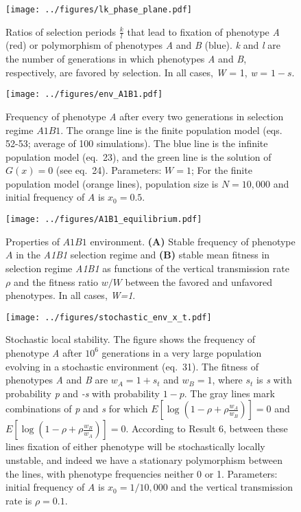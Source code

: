 \documentclass[]{article}
\begin{document}

\begin{figure}
\centering
\texttt{[image: ../figures/lk\_phase\_plane.pdf]}
\caption{Ratios of selection periods \(\frac{k}{l}\) that lead to
fixation of phenotype \emph{A} (red) or polymorphism of phenotypes
\emph{A} and \emph{B} (blue). \emph{k} and \emph{l} are the number of
generations in which phenotypes \emph{A} and \emph{B}, respectively, are favored by selection.
In all cases, \emph{W} = 1, \emph{w} = \(1-s\).}\label{fig:lk_phase_plane}
\end{figure}

\begin{figure}
\centering
\texttt{[image: ../figures/env\_A1B1.pdf]}
\caption{Frequency of phenotype \emph{A} after every two generations in
selection regime \(A1B1\). The orange line is the finite population model
(eqs. 52-53; average of 100 simulations). The blue line is the infinite population model
(eq.\ 23), and the green line is the  solution of \(G(x)=0\) (see eq.\ 24). Parameters: \(W=1\); For the finite population model (orange lines), population size is \(N=10,000\) and initial frequency of \(A\) is \(x_0=0.5\).}\label{fig:env_A1B1}
\end{figure}

\begin{figure}
\centering
\texttt{[image: ../figures/A1B1\_equilibrium.pdf]}
\caption{Properties of $A1B1$ environment.
\textbf{(A)} Stable frequency of phenotype $A$ in the \emph{A1B1} selection regime and \textbf{(B)} stable mean fitness in selection regime \emph{A1B1} as functions of the vertical transmission rate \(\rho\) and the fitness ratio \(w/W\) between the favored and unfavored phenotypes.
In all cases, \emph{W=1}.
}\label{fig:AkBl_equilibrium}
\end{figure}

\begin{figure}
\centering
\texttt{[image: ../figures/stochastic\_env\_x\_t.pdf]}
\caption{Stochastic local stability. 
The figure shows the frequency of phenotype \emph{A} after \(10^6\) generations in a very large population evolving in a stochastic environment (eq.\ 31).
The fitness of phenotypes \emph{A} and \emph{B} are \(w_A=1+s_t\) and \(w_B=1\),
where \(s_t\) is \emph{s} with probability \emph{p} and \emph{-s} with probability \(1-p\).
The gray lines mark combinations of \emph{p} and \emph{s} for which \(E[\log{(1-\rho+\rho\frac{w_A}{w_B})}]=0\) and \(E[\log{(1-\rho+\rho\frac{w_B}{w_A})}]=0\).
According to Result 6, between these lines fixation of either phenotype will be stochastically locally unstable, and indeed we have a stationary polymorphism between the lines, with phenotype frequencies neither 0 or 1.
Parameters: initial frequency of \(A\) is \(x_0=1/10,000\) and the vertical transmission rate is \(\rho=0.1\).}\label{fig:stochastic_env_x_t}
\end{figure}
\end{document}
